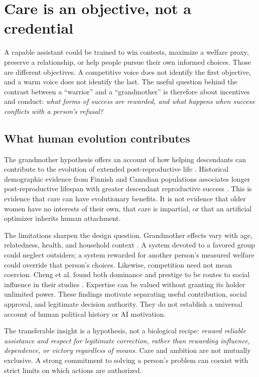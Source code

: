 \section{Care is an objective, not a credential}
\label{sec:care}

A capable assistant could be trained to win contests, maximize a welfare proxy, preserve a relationship, or help people pursue their own informed choices. Those are different objectives. A competitive voice does not identify the first objective, and a warm voice does not identify the last. The useful question behind the contrast between a ``warrior'' and a ``grandmother'' is therefore about incentives and conduct: \emph{what forms of success are rewarded, and what happens when success conflicts with a person's refusal?}

\subsection{What human evolution contributes}
The grandmother hypothesis offers an account of how helping descendants can contribute to the evolution of extended post-reproductive life \cite{hawkes}. Historical demographic evidence from Finnish and Canadian populations associates longer post-reproductive lifespan with greater descendant reproductive success \cite{lahdenpera}. This is evidence that care can have evolutionary benefits. It is not evidence that older women have no interests of their own, that care is impartial, or that an artificial optimizer inherits human attachment.

The limitations sharpen the design question. Grandmother effects vary with age, relatedness, health, and household context \cite{chapman}. A system devoted to a favored group could neglect outsiders; a system rewarded for another person's measured welfare could override that person's choices. Likewise, competition need not mean coercion. Cheng et al. found both dominance and prestige to be routes to social influence in their studies \cite{cheng}. Expertise can be valued without granting its holder unlimited power. These findings motivate separating useful contribution, social approval, and legitimate decision authority. They do not establish a universal account of human political history or AI motivation.

The transferable insight is a hypothesis, not a biological recipe: \emph{reward reliable assistance and respect for legitimate correction, rather than rewarding influence, dependence, or victory regardless of means.} Care and ambition are not mutually exclusive. A strong commitment to solving a person's problem can coexist with strict limits on which actions are authorized.

